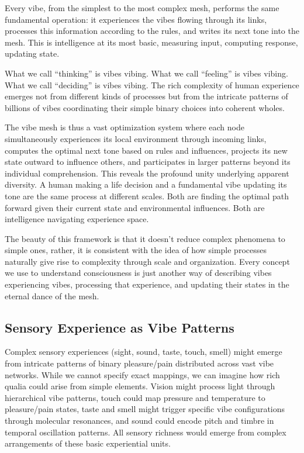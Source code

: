 Every vibe, from the simplest to the most complex mesh, performs the same fundamental operation: it experiences the vibes flowing through its links, processes this information according to the rules, and writes its next tone into the mesh. This is intelligence at its most basic, measuring input, computing response, updating state.

What we call ``thinking'' is vibes vibing. What we call ``feeling'' is vibes vibing. What we call ``deciding'' is vibes vibing. The rich complexity of human experience emerges not from different kinds of processes but from the intricate patterns of billions of vibes coordinating their simple binary choices into coherent wholes.

The vibe mesh is thus a vast optimization system where each node simultaneously experiences its local environment through incoming links, computes the optimal next tone based on rules and influences, projects its new state outward to influence others, and participates in larger patterns beyond its individual comprehension. This reveals the profound unity underlying apparent diversity. A human making a life decision and a fundamental vibe updating its tone are the same process at different scales. Both are finding the optimal path forward given their current state and environmental influences. Both are intelligence navigating experience space.

The beauty of this framework is that it doesn't reduce complex phenomena to simple ones, rather, it is consistent with the idea of how simple processes naturally give rise to complexity through scale and organization. Every concept we use to understand consciousness is just another way of describing vibes experiencing vibes, processing that experience, and updating their states in the eternal dance of the mesh.

\subsection{Sensory Experience as Vibe Patterns}

Complex sensory experiences (sight, sound, taste, touch, smell) might emerge from intricate patterns of binary pleasure/pain distributed across vast vibe networks. While we cannot specify exact mappings, we can imagine how rich qualia could arise from simple elements. Vision might process light through hierarchical vibe patterns, touch could map pressure and temperature to pleasure/pain states, taste and smell might trigger specific vibe configurations through molecular resonances, and sound could encode pitch and timbre in temporal oscillation patterns. All sensory richness would emerge from complex arrangements of these basic experiential units.

